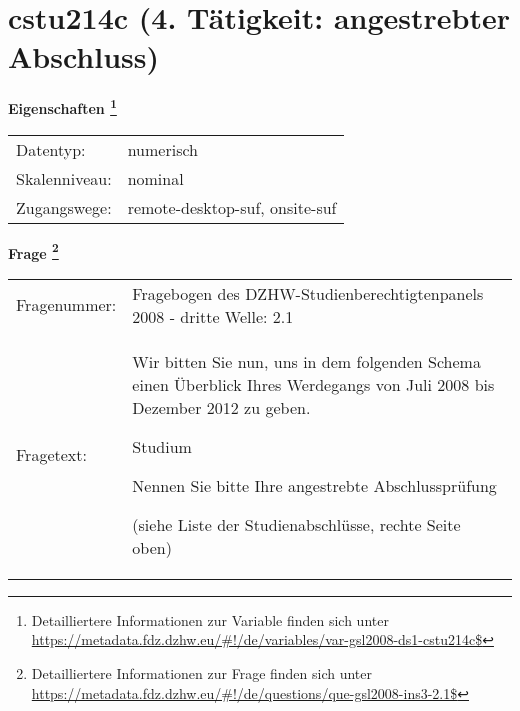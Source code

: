 
    \setcounter{footnote}{0}

    \vspace*{-1.8cm}
	\section{cstu214c (4. Tätigkeit: angestrebter Abschluss)}
	\label{section:cstu214c}



    \vspace*{0.5cm}
    \noindent\textbf{Eigenschaften
	\footnote{Detailliertere Informationen zur Variable finden sich unter
		\url{https://metadata.fdz.dzhw.eu/\#!/de/variables/var-gsl2008-ds1-cstu214c$}}}\\
	\begin{tabularx}{\hsize}{@{}lX}
	Datentyp: & numerisch \\
	Skalenniveau: & nominal \\
	Zugangswege: &
	  remote-desktop-suf, 
	  onsite-suf
 \\
    \end{tabularx}



				\vspace*{0.5cm}
                \noindent\textbf{Frage
	                \footnote{Detailliertere Informationen zur Frage finden sich unter
		              \url{https://metadata.fdz.dzhw.eu/\#!/de/questions/que-gsl2008-ins3-2.1$}}}\\
				\begin{tabularx}{\hsize}{@{}lX}
					Fragenummer: &
					  Fragebogen des DZHW-Studienberechtigtenpanels 2008 - dritte Welle:
					  2.1
 \\
					Fragetext: & Wir bitten Sie nun, uns in dem folgenden Schema einen Überblick Ihres Werdegangs von Juli 2008 bis Dezember 2012 zu geben.\par  Studium\par  Nennen Sie bitte Ihre angestrebte Abschlussprüfung \par  (siehe Liste der Studienabschlüsse, rechte Seite oben) \\
				\end{tabularx}





